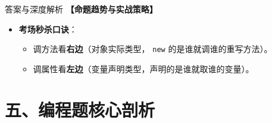\documentclass[12pt, a4paper]{ctexart}
\begin{document}
\begin{enumerate}[label=\textbf{\arabic*.}]
\begin{bluebox}{答案与深度解析}
		      \textbf{【命题趋势与实战策略】}
		      \begin{itemize}[leftmargin=*, nosep]
			      \item \textbf{考场秒杀口诀}：
			            \begin{itemize}
				            \item 调方法看\textbf{右边}（对象实际类型， \texttt{new} 的是谁就调谁的重写方法）。
				            \item 调属性看\textbf{左边}（变量声明类型，声明的是谁就取谁的变量）。
			            \end{itemize}
		      \end{itemize}
	      \end{bluebox}

\end{enumerate}

\newpage
\section{五、编程题核心剖析}
\end{document}
